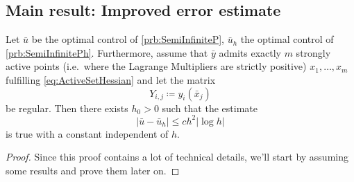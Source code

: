 \documentclass[../skript.tex]{subfiles}
\begin{document}
\subsection*{Main result: Improved error estimate}
\begin{theorem}
Let $\bar{u}$ be the optimal control of \cref{prb:SemiInfiniteP}, $\bar{u}_h$ the optimal control of \cref{prb:SemiInfinitePh}.
Furthermore, assume that $\bar{y}$ admits exactly $m$ strongly active points (i.e.\ where the Lagrange Multipliers are strictly positive) $x_1, \ldots, x_m$ fulfilling \cref{eq:ActiveSetHessian} and let the matrix
\[
	Y_{i,j} \coloneqq y_i(\bar{x}_j)
\]
be regular.
Then there exists $h_0 > 0$ such that the estimate
\[
	| \bar{u} - \bar{u}_h | \leq ch^2 | \log h |
\]
is true with a constant independent of $h$.
\end{theorem}
\begin{proof}
Since this proof contains a lot of technical details, we'll start by assuming some results and prove them later on.


\end{proof}
\end{document}

